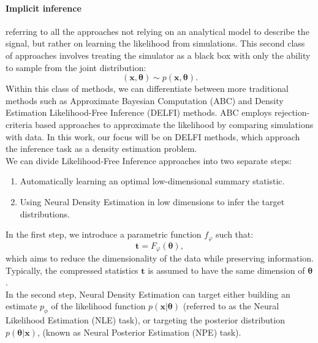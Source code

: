 \documentclass{aa}
\begin{document}
\paragraph{\textbf{Implicit inference}} referring to all the approaches not relying on an analytical model to describe the signal, but rather on learning the likelihood from simulations. This second class of approaches involves treating the simulator as a black box with only the ability to sample from the joint distribution:
\begin{equation}
    (\bm{x}, \bm{\theta})\sim p(\bm{x}, \bm{\theta}).
\end{equation}
Within this class of methods, we can differentiate between more traditional methods such as Approximate Bayesian Computation (ABC) and Density Estimation Likelihood-Free Inference (DELFI) methods. ABC employs rejection-criteria based approaches to approximate the likelihood by comparing simulations with data. 
In this work, our focus will be on DELFI methods, which approach the inference task as a density estimation problem. \\
We can divide Likelihood-Free Inference approaches into two separate steps:
\begin{enumerate}
    \item  Automatically learning an optimal low-dimensional summary statistic.
    \item Using Neural Density Estimation in low dimensions to infer the target distributions.
\end{enumerate}
In the first step, we introduce a parametric function $f_{\varphi}$ such that:
     \begin{equation}
         \bm{t}=F_{\varphi}(\bm{\theta}),
     \end{equation}
which aims to reduce the dimensionality of the data while preserving information. Typically, the compressed statistics $\bm{t}$ is assumed to have the same dimension of $\bm{\theta}$. \\
In the second step, Neural Density Estimation can target either building an estimate $p_{\phi}$ of the likelihood function $p(\bm{x}|\bm{\theta})$ (referred to as the Neural Likelihood Estimation (NLE) task), or targeting the posterior distribution $p(\bm{\theta}|\bm{x})$, (known as Neural Posterior Estimation (NPE) task). 
\end{document}
